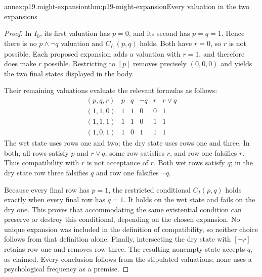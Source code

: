 \begin{annexitem}{annex:p19.might-expansion}{thm:p19-might-expansion}{Every valuation in the two expansions}
\begin{proof}
In \(I_0\), its first valuation has \(p=0\), and its second has
\(p=q=1\). Hence there is no \(p\land\neg q\) valuation and
\(C_{I_0}(p,q)\) holds. Both have \(r=0\), so \(r\) is not possible.
Each proposed expansion adds a valuation with \(r=1\), and therefore
does make \(r\) possible. Restricting to \([p]\) removes precisely
\((0,0,0)\) and yields the two final states displayed in the body.

Their remaining valuations evaluate the relevant formulas as follows:
\[
\begin{array}{c|ccccc}
 (p,q,r)&p&q&\neg q&r&r\lor q\\\hline
 (1,1,0)&1&1&0&0&1\\
 (1,1,1)&1&1&0&1&1\\
 (1,0,1)&1&0&1&1&1
\end{array}
\]
The wet state uses rows one and two; the dry state uses rows one and
three. In both, all rows satisfy \(p\) and \(r\lor q\), some row
satisfies \(r\), and row one falsifies \(r\). Thus compatibility with
\(r\) is not acceptance of \(r\). Both wet rows satisfy \(q\); in the
dry state row three falsifies \(q\) and row one falsifies \(\neg q\).

Because every final row has \(p=1\), the restricted conditional
\(C_I(p,q)\) holds exactly when every final row has \(q=1\). It holds
on the wet state and fails on the dry one. This proves that accommodating
the same existential condition can preserve or destroy this conditional,
depending on the chosen expansion. No unique expansion was included in
the definition of compatibility, so neither choice follows from that
definition alone. Finally, intersecting the dry state with \([\neg r]\)
retains row one and removes row three. The resulting nonempty state
accepts \(q\), as claimed. Every conclusion follows from the stipulated
valuations; none uses a psychological frequency as a premise.
\end{proof}
\end{annexitem}
